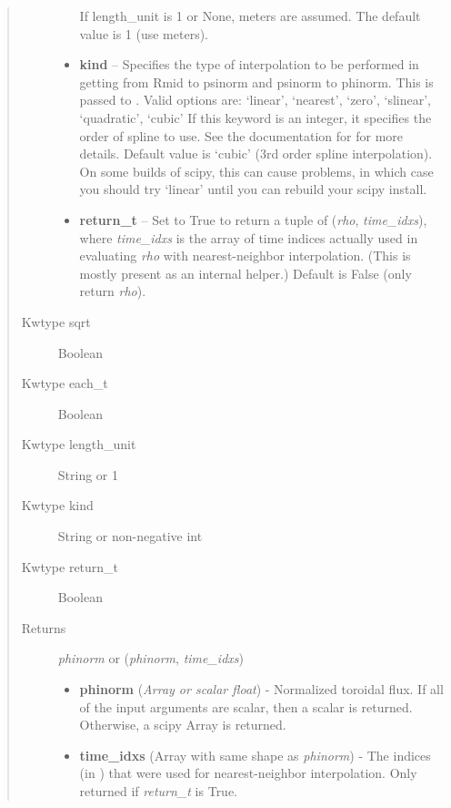 \documentclass[letterpaper,10pt,english]{sphinxmanual}
\begin{document}
\begin{fulllineitems}
\begin{fulllineitems}
\begin{quote}
\begin{description}
\begin{itemize}
\begin{quote}
\end{quote}

If length\_unit is 1 or None, meters are assumed. The default
value is 1 (use meters).


\item {} 
\textbf{kind} -- Specifies the type of
interpolation to be performed in getting from Rmid to
psinorm and psinorm to phinorm. This is passed to
. Valid options are:
`linear', `nearest', `zero', `slinear', `quadratic', `cubic'
If this keyword is an integer, it specifies the order of spline
to use. See the documentation for  for more
details. Default value is `cubic' (3rd order spline
interpolation). On some builds of scipy, this can cause problems,
in which case you should try `linear' until you can rebuild your
scipy install.

\item {} 
\textbf{return\_t} -- Set to True to return a tuple of (\emph{rho},
\emph{time\_idxs}), where \emph{time\_idxs} is the array of time indices
actually used in evaluating \emph{rho} with nearest-neighbor
interpolation. (This is mostly present as an internal helper.)
Default is False (only return \emph{rho}).

\end{itemize}

\item[{Kwtype sqrt}] \leavevmode
Boolean

\item[{Kwtype each\_t}] \leavevmode
Boolean

\item[{Kwtype length\_unit}] \leavevmode
String or 1

\item[{Kwtype kind}] \leavevmode
String or non-negative int

\item[{Kwtype return\_t}] \leavevmode
Boolean

\item[{Returns}] \leavevmode

\emph{phinorm} or (\emph{phinorm}, \emph{time\_idxs})
\begin{itemize}
\item {} 
\textbf{phinorm} (\emph{Array or scalar float}) - Normalized toroidal flux.
If all of the input arguments are scalar, then a scalar is
returned. Otherwise, a scipy Array is returned.

\item {} 
\textbf{time\_idxs} (Array with same shape as \emph{phinorm}) - The indices
(in ) that were used for
nearest-neighbor interpolation. Only returned if \emph{return\_t} is
True.


\end{itemize}
\end{description}
\end{quote}
\end{fulllineitems}
\end{fulllineitems}
\end{document}

